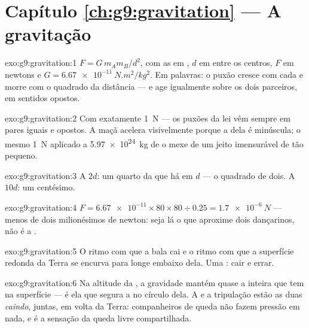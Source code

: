 \section*{Capítulo \ref{ch:g9:gravitation} --- A gravitação}

\begin{solution}{exo:g9:gravitation:1}
$F = G \, m_A m_B / d^2$, com as  em , $d$ em 
entre os centros, $F$ em newtons e
$G = \qty{6.67e-11}{N.m^2/kg^2}$. Em palavras: o puxão cresce com
cada  e morre com o quadrado da distância --- e age igualmente
sobre os dois parceiros, em sentidos opostos.
\end{solution}

\begin{solution}{exo:g9:gravitation:2}
Com exatamente \qty{1}{N} --- os puxões da lei vêm sempre em pares
iguais e opostos. A maçã acelera visivelmente porque a  dela é
minúscula; o mesmo \qty{1}{N} aplicado a \qty{5.97e24}{kg} de 
o mexe de um jeito imensurável de tão pequeno.
\end{solution}

\begin{solution}{exo:g9:gravitation:3}
A $2d$: um quarto da  que há em $d$ --- o quadrado de dois. A
$10d$: um centésimo.
\end{solution}

\begin{solution}{exo:g9:gravitation:4}
$F = \num{6.67e-11} \times 80 \times 80 \div 0.25 =
\qty{1.7e-6}{N}$ --- menos de dois milionésimos de newton: seja lá o
que aproxime dois dançarinos, não é a .
\end{solution}

\begin{solution}{exo:g9:gravitation:5}
O ritmo com que a bala cai e o ritmo com que a superfície redonda da
Terra se encurva para longe embaixo dela. Uma : cair e errar.
\end{solution}

\begin{solution}{exo:g9:gravitation:6}
Na altitude da , a gravidade mantém quase a  inteira que
tem na superfície --- é ela que segura a  no círculo dela. A
 e a tripulação estão as duas \emph{caindo}, juntas, em volta
da Terra: companheiros de queda não fazem pressão em nada, e 
é a sensação da queda livre compartilhada.
\end{solution}

